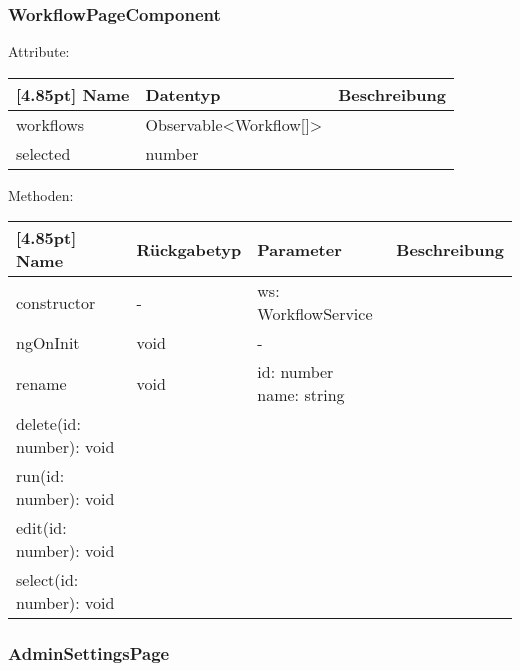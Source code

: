         	\subsubsection{WorkflowPageComponent}
        	
        	    Attribute:
                \begin{center}
                	\renewcommand{\arraystretch}{1.5}
                    \setlength\tabcolsep{5pt}
                	\begin{tabularx}{\textwidth}{|l|l|X|}
                		\hline
                        \rowcolor[gray]{0.75}[4.85pt]            		
                        Name & Datentyp & Beschreibung \\ \hline
                        workflows & Observable<Workflow[]> & \\ \hline
                        selected & number & \\ \hline
                	\end{tabularx}
                \end{center}
                
                Methoden:
        		\begin{center}
                \setlength\tabcolsep{5pt}
                	\renewcommand{\arraystretch}{1.5}
                    	\begin{tabularx}{\textwidth}{|l|l|l|X|}
                    	\hline
                    	\rowcolor[gray]{0.75}[4.85pt]
                		Name & Rückgabetyp & Parameter & Beschreibung \\ \hline
                		constructor & - & ws: WorkflowService & \\ \hline
                		ngOnInit & void & - & \\ \hline
                		rename & void & \thead{id: number\\name: string} & \\ \hline
                		delete(id: number): void \\ \hline
                		run(id: number): void \\ \hline
                		edit(id: number): void \\ \hline
                		select(id: number): void \\ \hline
                        \end{tabularx}
        		\end{center}
        	
        	\subsubsection{AdminSettingsPage}
        	
